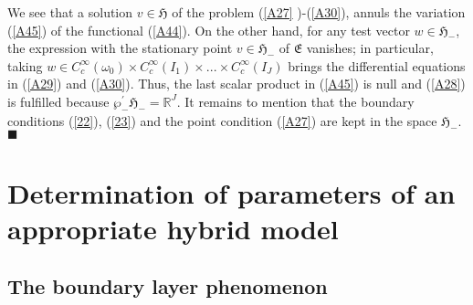 \documentclass[11pt]{article}%
\numberwithin{equation}{section}
\begin{document}
We see that a solution $v\in\mathfrak{H}$ of the problem (\ref{A27}%
)-(\ref{A30}), annuls the variation (\ref{A45}) of the functional (\ref{A44}).
On the other hand, for any test vector $w\in\mathfrak{H}_{-}$, the expression
with the stationary point $v\in\mathfrak{H}_{-}$ of $\mathfrak{E}$ vanishes;
in particular, taking $w\in C_{c}^{\infty}(\omega_{0})\times C_{c}^{\infty
}(I_{1})\times...\times C_{c}^{\infty}(I_{J})$ brings the differential
equations in (\ref{A29}) and (\ref{A30}). Thus, the last scalar product in
(\ref{A45}) is null and (\ref{A28}) is fulfilled because $\wp_{-}^{\prime
}\mathfrak{H}_{-}=\mathbb{R}^{J}.$ It remains to mention that the boundary
conditions (\ref{22}), (\ref{23}) and the point condition (\ref{A27}) are kept
in the space $\mathfrak{H}_{-}$. $\blacksquare$

\section{Determination of parameters of an appropriate hybrid
model\label{sect3}}

\subsection{The boundary layer phenomenon\label{sect3.1}}
\end{document}
